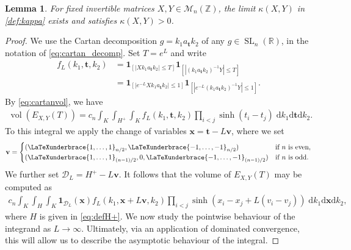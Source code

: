\documentclass[11pt,reqno]{amsart}
\let\underbrace\LaTeXunderbrace
\newtheorem{lem}[thm]{Lemma}
\theoremstyle{definition}
\theoremstyle{remark}
\newcommand{\vol}{\operatorname{vol}}
\newcommand{\SL}{\operatorname{SL}}
\numberwithin{equation}{section}
\numberwithin{thm}{section}
\numberwithin{table}{section}
\def \R {{\mathbb R}}
\def \Z {{\mathbb Z}}
\newcommand{\x}{\mathbf{x}}
\begin{document}
\begin{lem}\label{lem:volumecomputation}
    For fixed invertible matrices $X,Y \in \mathcal{M}_{n}(\Z)$, the limit $\kappa (X,Y)$ in
    \eqref{def:kappa} exists and satisfies $\kappa (X,Y)>0$.
\end{lem}
\begin{proof}
We use the 
Cartan decomposition     $g = k_1 a_{\mathbf{t}} k_2$ of any 
 $g \in \SL_n(\R)$, in the notation of \eqref{eq:cartan_decomp}.
   Set $T = e^L$ and write
  \begin{align*} 
  f_L(k_1,\mathbf{t},k_2) &= \mathbf{1}_{[| X k_1 a_{\mathbf{t}} k_2 | \le T]} 
      \mathbf{1}_{[| (k_1 a_{\mathbf{t}} k_2)^{-1} Y | \le T]}  \\
      &=
      \mathbf{1}_{[| e^{-L} X k_1 a_{\mathbf{t}} k_2 | \le 1]}  
      \mathbf{1}_{[|e^{-L} (k_1 a_{\mathbf{t}} k_2)^{-1} Y | \le 1]} .
  \end{align*}
  By \eqref{eq:cartanvol}, we have  
  \begin{align*}
      \vol(E_{X,Y}(T)) = c_n \int_K \int_{H^{+}}  \int_K f_L(k_1,\mathbf{t},k_2) \prod_{i<j} \sinh(t_i - t_j) \;
      \mathrm{d}k_1
      \mathrm{d} \mathbf{t}
      \mathrm{d}k_2.
  \end{align*}
  To this integral we apply the change of variables $\mathbf{x} = \mathbf{t} - L\mathbf{v}$, where we set 
  \begin{align}\label{eq:definitionof v}
  \mathbf{v} =
\begin{cases}
(\underbrace{1,\dots,1}_{n/2},
 \underbrace{-1,\dots,-1}_{n/2}) &\text{if $n$ is even},\\
(\underbrace{1,\dots,1}_{(n-1)/2},
 0,
 \underbrace{-1,\dots,-1}_{(n-1)/2}) & \text{if $n$ is odd.}
\end{cases}
  \end{align}
  We further set  $\mathcal{D}_L = H^+ -L \mathbf{v}$. It follows that the volume of $E_{X,Y}(T)$ may be computed as
  \begin{align}\label{eq:volEafterchangeofvariables}
      c_n \int_K \int_{H}  \int_K 
     \mathbf{1}_{\mathcal{D}_L}(\mathbf{x})
     f_L(k_1,\mathbf{x}+L\mathbf{v},k_2) \prod_{i<j} \sinh(x_i - x_j + L(v_i-v_j)) \;
      \mathrm{d}k_1
      \mathrm{d} \x
      \mathrm{d}k_2,
  \end{align}
  where $H$ is given in \eqref{eq:defH+}. 
  We now study the pointwise behaviour of the integrand as $L \to \infty$. Ultimately, via an application of dominated convergence, this will allow us to describe the asymptotic behaviour of the integral.


\end{proof}
\end{document}
